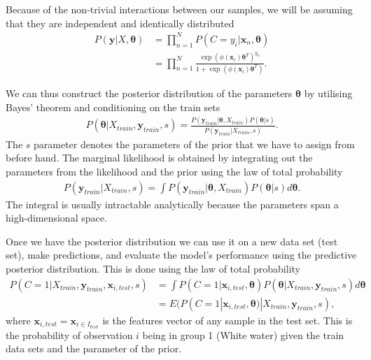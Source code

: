   Because of the non-trivial interactions between our samples, we will be assuming that they are independent and identically distributed
  \begin{align}
   P(\mathbf{y} | X, \bm{\theta}) &=\prod_{n=1}^{N} P\left(C=y_{i} | \mathbf{x}_{n}, \bm{\theta}\right) \\ 
   &=\prod_{n=1}^{N} \frac{\exp \left(\phi\left(\mathbf{x}_{i}\right)\bm{\theta}^{T} \right)^{y_{n}}}{1+\exp \left(\phi\left(\mathbf{x}_{i}\right) \bm{\theta}^{T} \right)} .
   \label{eq:likelihood}
   \end{align}
	
	We can thus construct the posterior distribution of the parameters $\bm{\theta}$ by utilising Bayes' theorem and conditioning on the train sets
	\begin{align}
	P\left(\bm{\theta}|X_{train},\mathbf{y}_{train},s\right) = \frac{	P\left(\mathbf{y}_{train}|\bm{\theta},X_{train}\right) P\left(\bm{\theta}|s\right)}{P\left(\mathbf{y}_{train}|X_{train},s\right)}.
	\end{align}
   The $s$ parameter denotes the parameters of the prior that we have to assign from before hand. 
   The marginal likelihood is obtained by integrating out the parameters from the likelihood and the prior using the law of total probability
   \begin{align}
   P\left(\mathbf{y}_{train}|X_{train},s\right) = \int P\left(\mathbf{y}_{train}|\bm{\theta},X_{train}\right) P\left(\bm{\theta}|s\right) d\bm{\theta}.
   \end{align}
   The integral is usually intractable analytically because the parameters span a high-dimensional space.
   
   Once we have the posterior distribution we can use it on a new data set (test set), make predictions, and evaluate the model's performance using the predictive posterior distribution. This is done using the law of total probability 
   \begin{align}
		P({C} = 1|X_{train},\mathbf{y}_{train},\mathbf{x}_{i,test},s) &= \int P(C=1|\mathbf{x}_{i,test},\bm{\theta})P(\bm{\theta}|X_{train},\mathbf{y}_{train},s) d\bm{\theta}\label{eq:classprob} \\
		&= E(P(C=1|\mathbf{x}_{i,test},\bm{\theta})|X_{train},\mathbf{y}_{train},s),
   \end{align}
   where $\mathbf{x}_{i,test}=\mathbf{x}_{i \in I_{test}} $ is the features vector of any sample in the test set.  This is the probability of observation $i$ being in group 1 (White water) given the train data sets and the parameter of the prior.

